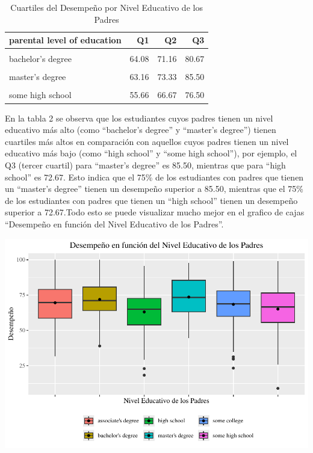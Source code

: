 \documentclass[
]{article}
\begin{document}
\begin{longtable}[t]{lrrr}
\caption{\label{tab:cuartiles}Cuartiles del Desempeño por Nivel Educativo de los Padres}\\
\toprule
parental level of education & Q1 & Q2 & Q3\\
\midrule
\cellcolor{gray!10}{associate's degree} & \cellcolor{gray!10}{58.67} & \cellcolor{gray!10}{69.67} & \cellcolor{gray!10}{79.00}\\
bachelor's degree & 64.08 & 71.16 & 80.67\\
\cellcolor{gray!10}{high school} & \cellcolor{gray!10}{53.92} & \cellcolor{gray!10}{65.00} & \cellcolor{gray!10}{72.67}\\
master's degree & 63.16 & 73.33 & 85.50\\
\cellcolor{gray!10}{some college} & \cellcolor{gray!10}{60.00} & \cellcolor{gray!10}{68.67} & \cellcolor{gray!10}{78.00}\\
\addlinespace
some high school & 55.66 & 66.67 & 76.50\\
\bottomrule
\end{longtable}

En la tabla 2 se observa que los estudiantes cuyos padres tienen un
nivel educativo más alto (como ``bachelor's degree'' y ``master's
degree'') tienen cuartiles más altos en comparación con aquellos cuyos
padres tienen un nivel educativo más bajo (como ``high school'' y ``some
high school''), por ejemplo, el Q3 (tercer cuartil) para ``master's
degree'' es 85.50, mientras que para ``high school'' es 72.67. Esto
indica que el 75\% de los estudiantes con padres que tienen un
``master's degree'' tienen un desempeño superior a 85.50, mientras que
el 75\% de los estudiantes con padres que tienen un ``high school''
tienen un desempeño superior a 72.67.Todo esto se puede visualizar mucho
mejor en el grafico de cajas ``Desempeño en función del Nivel Educativo
de los Padres''.

\begin{center}\includegraphics{Trabajo-Grupo-6.-Students-performance_files/figure-latex/grafico1-1} \end{center}
\end{document}
